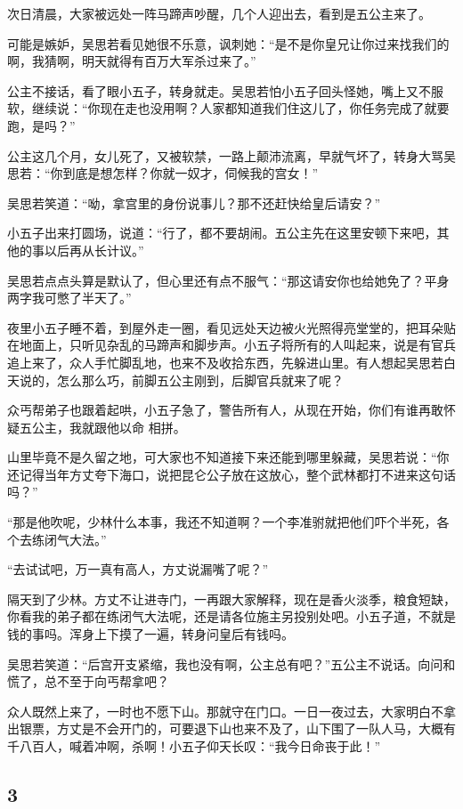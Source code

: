 次日清晨，大家被远处一阵马蹄声吵醒，几个人迎出去，看到是五公主来了。

可能是嫉妒，吴思若看见她很不乐意，讽刺她：“是不是你皇兄让你过来找我们的啊，我猜啊，明天就得有百万大军杀过来了。”

公主不接话，看了眼小五子，转身就走。吴思若怕小五子回头怪她，嘴上又不服软，继续说：“你现在走也没用啊？人家都知道我们住这儿了，你任务完成了就要跑，是吗？”

公主这几个月，女儿死了，又被软禁，一路上颠沛流离，早就气坏了，转身大骂吴思若：“你到底是想怎样？你就一奴才，伺候我的宫女！”

吴思若笑道：“呦，拿宫里的身份说事儿？那不还赶快给皇后请安？”

小五子出来打圆场，说道：“行了，都不要胡闹。五公主先在这里安顿下来吧，其他的事以后再从长计议。”

吴思若点点头算是默认了，但心里还有点不服气：“那这请安你也给她免了？平身两字我可憋了半天了。”
\newline

夜里小五子睡不着，到屋外走一圈，看见远处天边被火光照得亮堂堂的，把耳朵贴在地面上，只听见杂乱的马蹄声和脚步声。小五子将所有的人叫起来，说是有官兵追上来了，众人手忙脚乱地，也来不及收拾东西，先躲进山里。有人想起吴思若白天说的，怎么那么巧，前脚五公主刚到，后脚官兵就来了呢？

众丐帮弟子也跟着起哄，小五子急了，警告所有人，从现在开始，你们有谁再敢怀疑五公主，我就跟他以命
相拼。

山里毕竟不是久留之地，可大家也不知道接下来还能到哪里躲藏，吴思若说：“你还记得当年方丈夸下海口，说把昆仑公子放在这放心，整个武林都打不进来这句话吗？”

“那是他吹呢，少林什么本事，我还不知道啊？一个李准驸就把他们吓个半死，各个去练闭气大法。”

“去试试吧，万一真有高人，方丈说漏嘴了呢？”

隔天到了少林。方丈不让进寺门，一再跟大家解释，现在是香火淡季，粮食短缺，你看我的弟子都在练闭气大法呢，还是请各位施主另投别处吧。小五子道，不就是钱的事吗。浑身上下摸了一遍，转身问皇后有钱吗。

吴思若笑道：“后宫开支紧缩，我也没有啊，公主总有吧？”五公主不说话。向问和慌了，总不至于向丐帮拿吧？

众人既然上来了，一时也不愿下山。那就守在门口。一日一夜过去，大家明白不拿出银票，方丈是不会开门的，可要退下山也来不及了，山下围了一队人马，大概有千八百人，喊着冲啊，杀啊！小五子仰天长叹：“我今日命丧于此！”
\newline

{\centering\subsection{3}}

